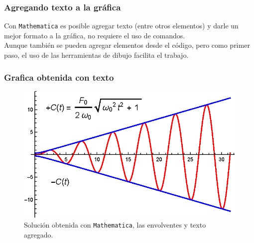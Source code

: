 \begin{frame}
\frametitle{Agregando texto a la gráfica}
Con \texttt{Mathematica} es posible agregar texto (entre otros elementos) y darle un mejor formato a la gráfica, no requiere el uso de comandos.
\\
\bigskip
\pause
Aunque también se pueden agregar elementos desde el código, pero como primer paso, el uso de las herramientas de dibujo facilita el trabajo.
\end{frame}
\begin{frame}
\frametitle{Grafica obtenida con texto}
\begin{figure}[H]
    \centering
    \includegraphics[scale=1]{Imagenes/Ejemplo_Resonancia_01_03.eps}
    \caption{Solución obtenida con \texttt{Mathematica}, las envolventes y texto agregado.}
\end{figure}
\end{frame}
